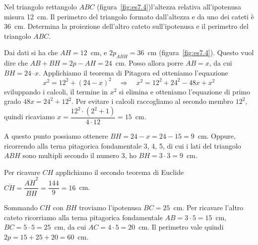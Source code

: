 
\begin{esempio}\label{es:7.5}

Nel triangolo rettangolo $ABC$ (figura~\ref{fig:es7.4})l'altezza relativa 
all'ipotenusa misura 12~cm. 
Il perimetro del triangolo formato dall'altezza e da uno 
dei cateti è 36~cm. Determina la proiezione dell'altro cateto 
sull'ipotenusa e il perimetro del triangolo $ABC$.\vspace{7pt}


Dai dati si ha che $AH = 12$~cm, e $2p_{ABH} = 36$~cm 
(figura~\ref{fig:es7.4}).
Questo vuol dire che $AB + BH = 2p - AH = 24$~cm. 
Posso allora porre $AB = x$, da cui $BH = 24 – x$.
Applichiamo il teorema di Pitagora ed otteniamo l'equazione
\[x^2 = 12^2 + (24 - x)^2 \quad\Rightarrow\quad x^2 = 12^2 + 24^2 - 
48x + x^2\]
sviluppando i calcoli, il termine in $x^2$ si elimina e otteniamo 
l'equazione di primo grado $48x = 24^2 + 12^2$.
Per evitare i calcoli raccogliamo al secondo membro $12^2$, quindi 
ricaviamo $x=\dfrac{12^2\cdot\left(2^2+1\right)}{4\cdot 12}=15$~cm.

A questo punto possiamo ottenere $BH = 24-x = 24-15 = 9$~cm. Oppure, 
ricorrendo alla terna pitagorica fondamentale 3, 4, 5, di cui i lati 
del triangolo $ABH$ sono multipli secondo il numero 3, ho $BH = 3 
\cdot 3 = 9$~cm.

Per ricavare $CH$ applichiamo il secondo teorema di Euclide 
$\overline{CH}=\dfrac{\overline{AH}^2}{\overline{BH}}=\dfrac{144}{9}
=16$~cm.

Sommando $CH$ con $BH$ troviamo l'ipotenusa $BC=25$~cm. Per ricavare 
l'altro cateto ricorriamo alla terna pitagorica fondamentale 
$AB=3\cdot 5=15$~cm, $BC=5\cdot 5=25$~cm, da cui $AC=4\cdot 5=20$~cm.
Il perimetro vale quindi $2p=15+25+20=60$~cm.
\end{esempio}

